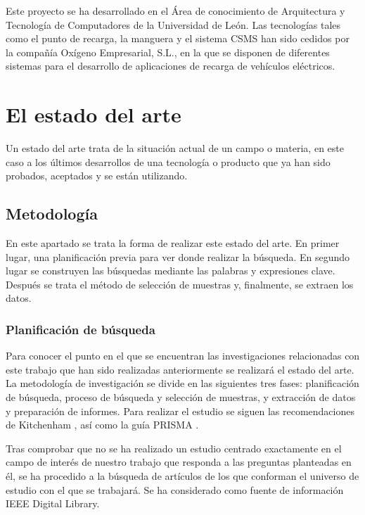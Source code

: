 \documentclass[12pt,a4paper,onecolumn,oneside]{report}
\begin{document}
Este proyecto se ha desarrollado en el Área de conocimiento de Arquitectura y Tecnología de Computadores de la Universidad de
León. Las tecnologías tales como el punto de recarga, la manguera y el sistema CSMS han sido cedidos por la compañía Oxígeno Empresarial, S.L., en la que se disponen de diferentes sistemas para el desarrollo de aplicaciones de recarga de vehículos eléctricos. 


\section{El estado del arte}

Un estado del arte trata de la situación actual de un campo o materia, en este caso a los últimos desarrollos de una tecnología o producto que ya han sido probados, aceptados y se están utilizando.

\subsection{Metodología}

En este apartado se trata la forma de realizar este estado del arte. En primer lugar, una planificación previa para ver donde realizar la búsqueda. En segundo lugar se construyen las búsquedas mediante las palabras y expresiones clave. Después se trata el método de selección de muestras y, finalmente, se extraen los datos.

\subsubsection{Planificación de búsqueda}

Para conocer el punto en el que se encuentran las investigaciones relacionadas con este trabajo que han sido realizadas anteriormente se realizará el estado del arte. La metodología de investigación se divide en las siguientes tres fases: planificación de búsqueda, proceso de búsqueda y selección de muestras, y extracción de datos y preparación de informes. Para realizar el estudio se siguen las recomendaciones de Kitchenham \cite{nueve}, así como la guía PRISMA \cite{diez}. 

Tras comprobar que no se ha realizado un estudio centrado exactamente en el campo de interés de nuestro trabajo que responda a las preguntas planteadas en él, se ha procedido a la búsqueda de artículos de los que conforman el universo de estudio con el que se trabajará. Se ha considerado como fuente de información IEEE Digital Library.
\end{document}
